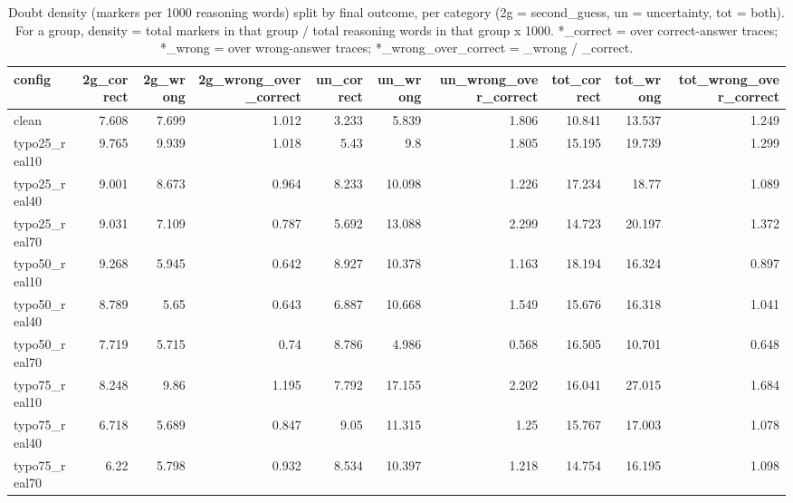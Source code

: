 \documentclass[11pt]{article}
\begin{document}
\begin{table}[H]
\centering
\caption{Doubt density (markers per 1000 reasoning words) split by final outcome, per category (2g = second\_guess, un = uncertainty, tot = both). For a group, density = total markers in that group / total reasoning words in that group x 1000. *\_correct = over correct-answer traces; *\_wrong = over wrong-answer traces; *\_wrong\_over\_correct = \_wrong / \_correct.}
\small
\begin{adjustbox}{max width=\textwidth}
\begin{tabular}{lrrrrrrrrr}
\toprule
\textbf{config} & \textbf{2g\_correct} & \textbf{2g\_wrong} & \textbf{2g\_wrong\_over\_correct} & \textbf{un\_correct} & \textbf{un\_wrong} & \textbf{un\_wrong\_over\_correct} & \textbf{tot\_correct} & \textbf{tot\_wrong} & \textbf{tot\_wrong\_over\_correct} \\
\midrule
clean & 7.608 & 7.699 & 1.012 & 3.233 & 5.839 & 1.806 & 10.841 & 13.537 & 1.249 \\
typo25\_real10 & 9.765 & 9.939 & 1.018 & 5.43 & 9.8 & 1.805 & 15.195 & 19.739 & 1.299 \\
typo25\_real40 & 9.001 & 8.673 & 0.964 & 8.233 & 10.098 & 1.226 & 17.234 & 18.77 & 1.089 \\
typo25\_real70 & 9.031 & 7.109 & 0.787 & 5.692 & 13.088 & 2.299 & 14.723 & 20.197 & 1.372 \\
typo50\_real10 & 9.268 & 5.945 & 0.642 & 8.927 & 10.378 & 1.163 & 18.194 & 16.324 & 0.897 \\
typo50\_real40 & 8.789 & 5.65 & 0.643 & 6.887 & 10.668 & 1.549 & 15.676 & 16.318 & 1.041 \\
typo50\_real70 & 7.719 & 5.715 & 0.74 & 8.786 & 4.986 & 0.568 & 16.505 & 10.701 & 0.648 \\
typo75\_real10 & 8.248 & 9.86 & 1.195 & 7.792 & 17.155 & 2.202 & 16.041 & 27.015 & 1.684 \\
typo75\_real40 & 6.718 & 5.689 & 0.847 & 9.05 & 11.315 & 1.25 & 15.767 & 17.003 & 1.078 \\
typo75\_real70 & 6.22 & 5.798 & 0.932 & 8.534 & 10.397 & 1.218 & 14.754 & 16.195 & 1.098 \\
\bottomrule
\end{tabular}
\end{adjustbox}
\end{table}
\end{document}
